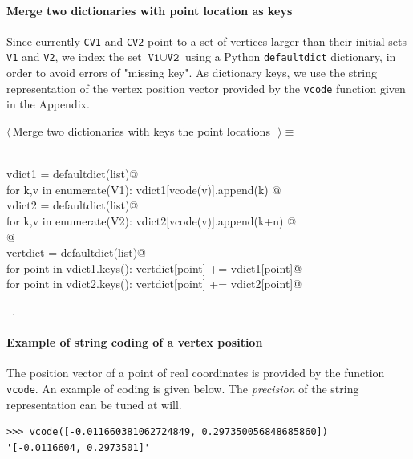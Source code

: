 \documentclass[11pt,oneside]{article}	%
\begin{document}
\paragraph{Merge two dictionaries with point location as keys}
Since currently \texttt{CV1} and \texttt{CV2} point to a set of vertices larger than their initial sets 
\texttt{V1} and \texttt{V2}, we index the set $\texttt{V1} \cup \texttt{V2}$ using a Python \texttt{defaultdict} dictionary, in order to avoid errors of "missing key". As dictionary keys, we use the string representation of the vertex position vector provided by the \texttt{vcode} function given in the Appendix.
\begin{flushleft} \small \label{scrap4}
$\langle\,$Merge two dictionaries with keys the point locations\nobreak\ {\footnotesize {}}$\,\rangle\equiv$
\vspace{-1ex}
\begin{list}{}{} \item
\mbox{}\verb@@\\
\mbox{}\verb@   vdict1 = defaultdict(list)@\\
\mbox{}\verb@   for k,v in enumerate(V1): vdict1[vcode(v)].append(k) @\\
\mbox{}\verb@   vdict2 = defaultdict(list)@\\
\mbox{}\verb@   for k,v in enumerate(V2): vdict2[vcode(v)].append(k+n) @\\
\mbox{}\verb@   @\\
\mbox{}\verb@   vertdict = defaultdict(list)@\\
\mbox{}\verb@   for point in vdict1.keys(): vertdict[point] += vdict1[point]@\\
\mbox{}\verb@   for point in vdict2.keys(): vertdict[point] += vdict2[point]@\\
\mbox{}\verb@@{\NWsep}
\end{list}
\vspace{-1ex}
\footnotesize\addtolength{\baselineskip}{-1ex}
\begin{list}{}{\setlength{\itemsep}{-\parsep}\setlength{\itemindent}{-\leftmargin}}
\item \NWtxtMacroRefIn\ .
\end{list}
\end{flushleft}

\paragraph{Example of string coding of a vertex position}
The position vector of a point of real coordinates is provided by the function \texttt{vcode}.
An example of coding is given below. The \emph{precision} of the string representation can be tuned at will.
{\small
\begin{verbatim}
>>> vcode([-0.011660381062724849, 0.297350056848685860])
'[-0.0116604, 0.2973501]'
\end{verbatim}}
\end{document}
